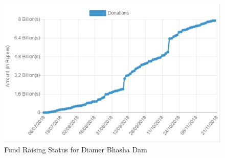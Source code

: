 \documentclass[11pt, journal,letterpaper,compsoc]{IEEEtran}
\begin{document}
\begin{figure}  [h!]
\includegraphics[width=\linewidth]{images/fund-status}
 \caption{Fund Raising Status for Diamer Bhasha Dam}
\end{figure}
\end{document}

